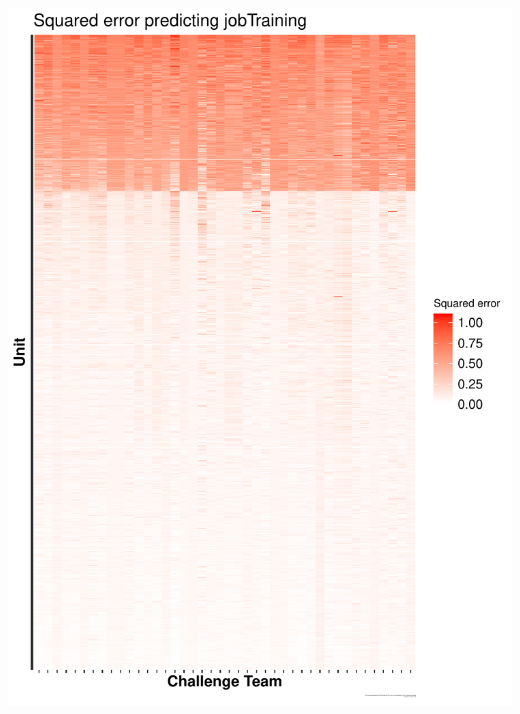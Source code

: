 \documentclass{beamer}
\begin{document}
\begin{frame}
\begin{center}
\includegraphics[width=0.30\textheight]{figures/jobtraining_ysort_mse_unit_outcome_xsort_mse_account_outcome.pdf}

\end{center}
\end{frame}
\end{document}
